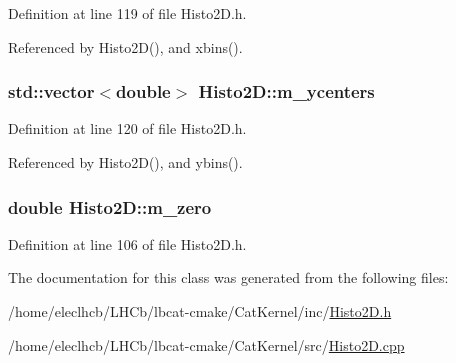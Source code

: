 Definition at line 119 of file Histo2D.h.

Referenced by Histo2D(), and xbins().\hypertarget{classHisto2D_a2a431c0f22a038482fc8b3913743f08b}{
\subsubsection[{m\_\-ycenters}]{\setlength{\rightskip}{0pt plus 5cm}std::vector$<$double$>$ {\bf Histo2D::m\_\-ycenters}}}
\label{classHisto2D_a2a431c0f22a038482fc8b3913743f08b}


Definition at line 120 of file Histo2D.h.

Referenced by Histo2D(), and ybins().\hypertarget{classHisto2D_a71dfc840fbaa159ef22091312d1ae5d9}{
\subsubsection[{m\_\-zero}]{\setlength{\rightskip}{0pt plus 5cm}double {\bf Histo2D::m\_\-zero}}}
\label{classHisto2D_a71dfc840fbaa159ef22091312d1ae5d9}


Definition at line 106 of file Histo2D.h.

The documentation for this class was generated from the following files:\begin{DoxyCompactItemize}
\item 
/home/eleclhcb/LHCb/lbcat-\/cmake/CatKernel/inc/\hyperlink{Histo2D_8h}{Histo2D.h}\item 
/home/eleclhcb/LHCb/lbcat-\/cmake/CatKernel/src/\hyperlink{Histo2D_8cpp}{Histo2D.cpp}\end{DoxyCompactItemize}
